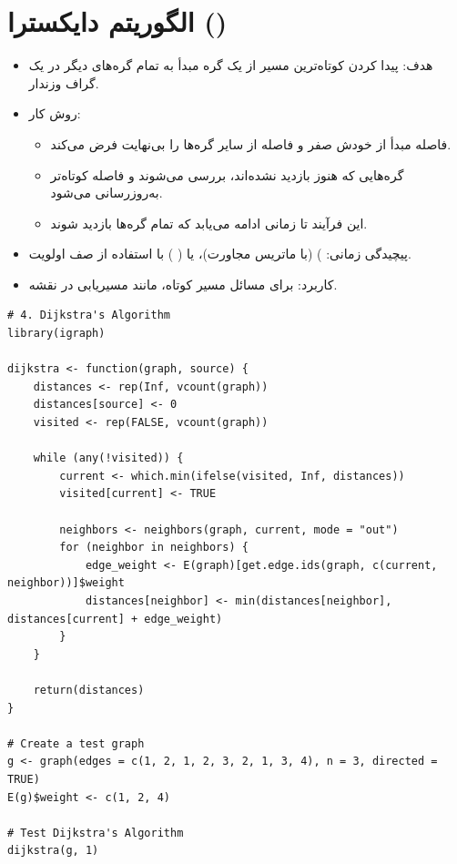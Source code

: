 \documentclass[11pt, a4paper, oneside]{book}
\begin{document}
			
		\section{الگوریتم دایکسترا ()}
			
			
			\begin{itemize}
				
				\item {\large هدف}:
				پیدا کردن کوتاه‌ترین مسیر از یک گره مبدأ به تمام گره‌های دیگر در یک گراف وزندار.
				
				\item {\large روش کار}: \par
				
				\begin{itemize}
					
					\item فاصله مبدأ از خودش صفر و فاصله از سایر گره‌ها را بی‌نهایت فرض می‌کند.
					
					\item گره‌هایی که هنوز بازدید نشده‌اند، بررسی می‌شوند و فاصله کوتاه‌تر به‌روزرسانی می‌شود.
					
					\item این فرآیند تا زمانی ادامه می‌یابد که تمام گره‌ها بازدید شوند.
					
				\end{itemize}
				
				\item {\large پیچیدگی زمانی}:
				) (با ماتریس مجاورت)، یا (
				) با استفاده از صف اولویت.
				
				\item {\large کاربرد}:
				برای مسائل مسیر کوتاه، مانند مسیر‌یابی در نقشه.
				
			\end{itemize}
			
			\begin{latin}
				\begin{lstlisting}[caption={\lr{Dijkstra's Algorithm}}] 
# 4. Dijkstra's Algorithm
library(igraph)

dijkstra <- function(graph, source) {
	distances <- rep(Inf, vcount(graph))
	distances[source] <- 0
	visited <- rep(FALSE, vcount(graph))
	
	while (any(!visited)) {
		current <- which.min(ifelse(visited, Inf, distances))
		visited[current] <- TRUE
		
		neighbors <- neighbors(graph, current, mode = "out")
		for (neighbor in neighbors) {
			edge_weight <- E(graph)[get.edge.ids(graph, c(current, neighbor))]$weight
			distances[neighbor] <- min(distances[neighbor], distances[current] + edge_weight)
		}
	}
	
	return(distances)
}

# Create a test graph
g <- graph(edges = c(1, 2, 1, 2, 3, 2, 1, 3, 4), n = 3, directed = TRUE)
E(g)$weight <- c(1, 2, 4)

# Test Dijkstra's Algorithm
dijkstra(g, 1)

				\end{lstlisting}
			\end{latin}
			
\end{document}
